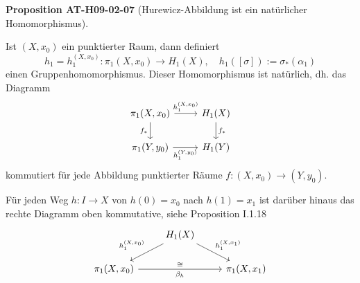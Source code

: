 \documentclass[10pt, letterpaper]{article}
\newcommand{\CustomHeading}[3]{%
  \par\medskip\noindent%
  \textbf{#1 #2} \textnormal{(#3)}.\enskip%
}
\newenvironment{PROP}[2]{\CustomHeading{Proposition}{#1}{#2}}{}
\begin{document}
\begin{PROP}{AT-H09-02-07}{Hurewicz-Abbildung ist ein natürlicher Homomorphismus}
Ist $(X, x_0)$ ein punktierter Raum, dann definiert 
$$h_1=h_1^{\left(X, x_0\right)}: \pi_1\left(X, x_0\right) \rightarrow H_1(X), \quad h_1([\sigma]):=\sigma_*\left(\alpha_1\right)$$
einen Gruppenhomomorphismus. Dieser Homomorphismus ist natürlich, dh. das Diagramm
\[
\begin{tikzcd}
\pi_1(X, x_0) \arrow[r, "h_1^{(X,x_0)}"] \arrow[d, "f_*"'] & H_1(X) \arrow[d, "f_*"] \\
\pi_1(Y, y_0) \arrow[r, "h_1^{(Y,y_0)}"'] & H_1(Y)
\end{tikzcd}
\]
kommutiert für jede Abbildung punktierter Räume $f:\left(X, x_0\right) \rightarrow\left(Y, y_0\right)$. 

Für jeden Weg $h: I \rightarrow X$ von $h(0)=x_0$ nach $h(1)=x_1$ ist darüber hinaus das rechte Diagramm oben kommutative, siehe Proposition I.1.18
\[
\begin{tikzcd}
  & H_1(X) \arrow[dl, "h_1^{(X,x_0)}"'] \arrow[dr, "h_1^{(X,x_1)}"] \\
  \pi_1(X, x_0) \arrow[rr, "\beta_h"', "\cong"{above}] & & \pi_1(X, x_1)
\end{tikzcd}
\]
\end{PROP}
\end{document}
